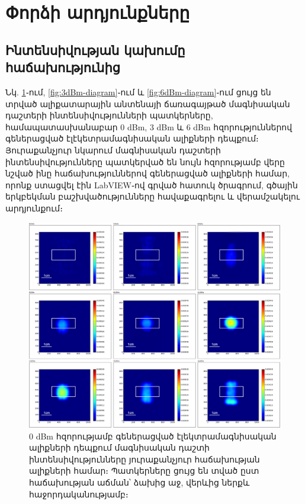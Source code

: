 \documentclass[12pt, fleqn]{report}
\begin{document}
\newpage

\section{Փորձի արդյունքները}
\subsection{Ինտենսիվության կախումը հաճախությունից}  
 Նկ. \ref{fig:0dBm-diagram}֊ում, \ref{fig:3dBm-diagram}֊ում և \ref{fig:6dBm-diagram}֊ում ցույց են տրված ալիքատարային անտենայի ճառագայթած մագնիսական դաշտերի ինտենսիվությունների պատկերները, համապատասխանաբար 0 dBm, 3 dBm և 6 dBm հզորություններով գեներացված էլէկետրամագնիսական ալիքների դեպքում։ Յուրաքանչյուր նկարում մագնիսական դաշտերի ինտենսիվությունները պատկերված են նույն հզորությամբ վերը նշված ինը հաճախություններով գեներացված ալիքների համար, որոնք ստացվել էին LabVIEW֊ով գրված հատուկ ծրագրում, գծային երկբեկման բաշխվածությունները հավաքագրելու և վերամշակելու արդյունքում։
\begin{figure}
    \begin{adjustwidth}{-0.8cm}{}
    \centering
    \includegraphics[width=1.0\linewidth]{data/experiment-results/free field of antenna, 6-14ghz, 0dbm generator output, distance 5mm.png}
    \caption{0 dBm հզորությամբ գեներացված էլեկտրամագնիսական ալիքների դեպքում մագնիսական դաշտի ինտենսիվությունները յուրաքանչյուր հաճախության ալիքների համար։ Պատկերները ցույց են տված ըստ հաճախության աճման՝ ձախից աջ, վերևից ներքև հաջորդականությամբ։}
    \label{fig:0dBm-diagram}
\end{adjustwidth}
\end{figure}
\end{document}
